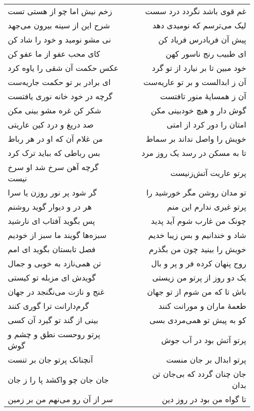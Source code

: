 \begin{center}
\begin{longtable}{l p{0.5cm} r}
\\
زخم نیش اما چو از هستی تست
&&
غم قوی باشد نگردد درد سست
\\
شرح این از سینه بیرون می‌جهد
&&
لیک می‌ترسم که نومیدی دهد
\\
نی مشو نومید و خود را شاد کن
&&
پیش آن فریادرس فریاد کن
\\
کای محب عفو از ما عفو کن
&&
ای طبیب رنج ناسور کهن
\\
عکس حکمت آن شقی را یاوه کرد
&&
خود مبین تا بر نیارد از تو گرد
\\
ای برادر بر تو حکمت جاریه‌ست
&&
آن ز ابدالست و بر تو عاریه‌ست
\\
گرچه در خود خانه نوری یافتست
&&
آن ز همسایهٔ منور تافتست
\\
شکر کن غره مشو بینی مکن
&&
گوش دار و هیچ خودبینی مکن
\\
صد دریغ و درد کین عاریتی
&&
امتان را دور کرد از امتی
\\
من غلام آن که او در هر رباط
&&
خویش را واصل نداند بر سماط
\\
بس رباطی که بباید ترک کرد
&&
تا به مسکن در رسد یک روز مرد
\\
گرچه آهن سرخ شد او سرخ نیست
&&
پرتو عاریت آتش‌زنیست
\\
گر شود پر نور روزن یا سرا
&&
تو مدان روشن مگر خورشید را
\\
هر در و دیوار گوید روشنم
&&
پرتو غیری ندارم این منم
\\
پس بگوید آفتاب ای نارشید
&&
چونک من غارب شوم آید پدید
\\
سبزه‌ها گویند ما سبز از خودیم
&&
شاد و خندانیم و بس زیبا خدیم
\\
فصل تابستان بگوید ای امم
&&
خویش را بینید چون من بگذرم
\\
تن همی‌نازد به خوبی و جمال
&&
روح پنهان کرده فر و پر و بال
\\
گویدش ای مزبله تو کیستی
&&
یک دو روز از پرتو من زیستی
\\
غنج و نازت می‌نگنجد در جهان
&&
باش تا که من شوم از تو جهان
\\
گرم‌دارانت ترا گوری کنند
&&
طعمهٔ ماران و مورانت کنند
\\
بینی از گند تو گیرد آن کسی
&&
کو به پیش تو همی‌مردی بسی
\\
پرتو روحست نطق و چشم و گوش
&&
پرتو آتش بود در آب جوش
\\
آنچنانک پرتو جان بر تنست
&&
پرتو ابدال بر جان منست
\\
جان جان چو واکشد پا را ز جان
&&
جان چنان گردد که بی‌جان تن بدان
\\
سر از آن رو می‌نهم من بر زمین
&&
تا گواه من بود در روز دین
\\

\end{longtable}
\end{center}
